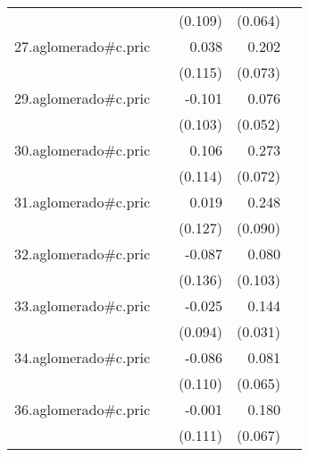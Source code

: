 {\begin{longtable}{l*{4}{D{.}{.}{-1}}}
            &                     &     (0.109)         &     (0.064)         &                     \\
\addlinespace
27.aglomerado#c.pric&                     &       0.038         &       0.202\sym{**} &                     \\
            &                     &     (0.115)         &     (0.073)         &                     \\
\addlinespace
29.aglomerado#c.pric&                     &      -0.101         &       0.076         &                     \\
            &                     &     (0.103)         &     (0.052)         &                     \\
\addlinespace
30.aglomerado#c.pric&                     &       0.106         &       0.273\sym{***}&                     \\
            &                     &     (0.114)         &     (0.072)         &                     \\
\addlinespace
31.aglomerado#c.pric&                     &       0.019         &       0.248\sym{**} &                     \\
            &                     &     (0.127)         &     (0.090)         &                     \\
\addlinespace
32.aglomerado#c.pric&                     &      -0.087         &       0.080         &                     \\
            &                     &     (0.136)         &     (0.103)         &                     \\
\addlinespace
33.aglomerado#c.pric&                     &      -0.025         &       0.144\sym{***}&                     \\
            &                     &     (0.094)         &     (0.031)         &                     \\
\addlinespace
34.aglomerado#c.pric&                     &      -0.086         &       0.081         &                     \\
            &                     &     (0.110)         &     (0.065)         &                     \\
\addlinespace
36.aglomerado#c.pric&                     &      -0.001         &       0.180\sym{**} &                     \\
            &                     &     (0.111)         &     (0.067)         &                     \\

\end{longtable}}
